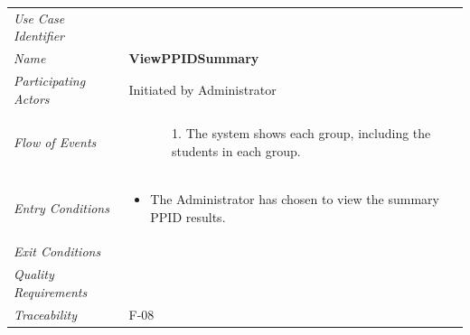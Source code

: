 \documentclass[12pt,letterpaper]{article}
\begin{document}
\begin{center}
	\begin{tabu} to 
		\toprule
		Use Case Identifier & \viewppidsummary{} \\
		Name & {\bf ViewPPIDSummary} \\
		Participating Actors & Initiated by Administrator \\
		Flow of Events & 
	    \begin{enumerate}[topsep=-1em,leftmargin=*]
		    \item[]
		    \begin{enumerate}
		        \item[1.] The system shows each group, including the students in each group.
		    \end{enumerate}
		\end{enumerate} \\

		Entry Conditions &
		\begin{itemize}[topsep=-1em,leftmargin=*]
		    \item The Administrator has chosen to view the summary PPID results.
        \end{itemize} \\

		Exit Conditions & \\

		Quality Requirements & \\

		Traceability & F-08 \\
		\toprule
	\end{tabu}
\end{center}
\end{document}
